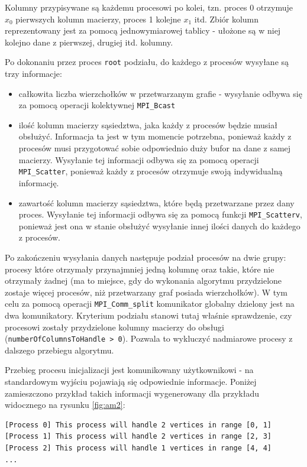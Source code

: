 \documentclass[12pt]{article}
\begin{document}
Kolumny przypisywane są każdemu procesowi po kolei, tzn. proces 0 otrzymuje $x_0$ pierwszych kolumn macierzy, proces 1 kolejne $x_1$ itd. Zbiór kolumn reprezentowany jest za pomocą jednowymiarowej tablicy - ułożone są w niej kolejno dane z pierwszej, drugiej itd. kolumny.

\newpage
Po dokonaniu przez proces \lstinline{root} podziału, do każdego z procesów wysyłane są trzy informacje:
\begin{itemize}
\item całkowita liczba wierzchołków w przetwarzanym grafie - wysyłanie odbywa się za pomocą operacji kolektywnej \lstinline{MPI_Bcast}
\item ilość kolumn macierzy sąsiedztwa, jaka każdy z procesów będzie musiał obsłużyć. Informacja ta jest w tym momencie potrzebna, ponieważ każdy z procesów musi przygotować sobie odpowiednio duży bufor na dane z samej macierzy. Wysyłanie tej informacji odbywa się za pomocą operacji \lstinline{MPI_Scatter}, ponieważ każdy z procesów otrzymuje swoją indywidualną informację.
\item zawartość kolumn macierzy sąsiedztwa, które będą przetwarzane przez dany proces. Wysyłanie tej informacji odbywa się za pomocą funkcji \lstinline{MPI_Scatterv}, ponieważ jest ona w stanie obsłużyć wysyłanie innej ilości danych do każdego z procesów.
\end{itemize}

Po zakończeniu wysyłania danych następuje podział procesów na dwie grupy: procesy które otrzymały przynajmniej jedną kolumnę oraz takie, które nie otrzymały żadnej (ma to miejsce, gdy do wykonania algorytmu przydzielone zostaje więcej procesów, niż przetwarzany graf posiada wierzchołków). W tym celu za pomocą operacji \lstinline{MPI_Comm_split} komunikator globalny dzielony jest na dwa komunikatory. Kryterium podziału stanowi tutaj właśnie sprawdzenie, czy procesowi zostały przydzielone kolumny macierzy do obsługi (\lstinline{numberOfColumnsToHandle > 0}). Pozwala to wykluczyć nadmiarowe procesy z dalszego przebiegu algorytmu.

\vspace{5mm}
Przebieg procesu inicjalizacji jest komunikowany użytkownikowi - na standardowym wyjściu pojawiają się odpowiednie informacje. Poniżej zamieszczono przykład takich informacji wygenerowany dla przykładu widocznego na rysunku \ref{fig:am2}:

\begin{lstlisting}
[Process 0] This process will handle 2 vertices in range [0, 1]
[Process 1] This process will handle 2 vertices in range [2, 3]
[Process 2] This process will handle 1 vertices in range [4, 4]
...
\end{lstlisting}
\end{document}
